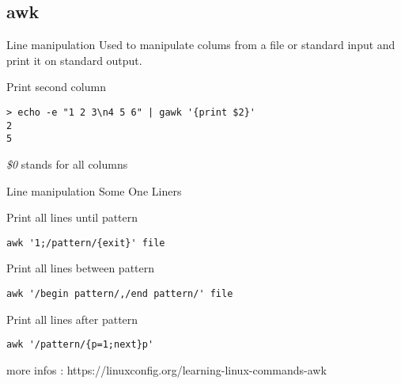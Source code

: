 \subsection{awk}

\begin{frame}[fragile]{Line manipulation}
Used to manipulate colums from a file or standard input and print it on standard output.
  \pause
  \begin{exampleblock}{Print second column}
    \begin{lstlisting}[showstringspaces=false]
> echo -e "1 2 3\n4 5 6" | gawk '{print $2}'
2
5
    \end{lstlisting}
  \end{exampleblock}
\pause
\emph{\$0} stands for all columns
\pause

\end{frame}

\begin{frame}[fragile]{Line manipulation}
Some One Liners
  \pause
  \begin{exampleblock}{Print all lines until pattern}
    \begin{lstlisting}[showstringspaces=false]
awk '1;/pattern/{exit}' file
    \end{lstlisting}
  \end{exampleblock}
  \pause

  \begin{exampleblock}{Print all lines between pattern}
    \begin{lstlisting}[showstringspaces=false]
awk '/begin pattern/,/end pattern/' file
    \end{lstlisting}
  \end{exampleblock}
  \pause

  \begin{exampleblock}{Print all lines after pattern}
    \begin{lstlisting}[showstringspaces=false]
awk '/pattern/{p=1;next}p'
    \end{lstlisting}
  \end{exampleblock}
\pause

more infos : https://linuxconfig.org/learning-linux-commands-awk
\end{frame}

